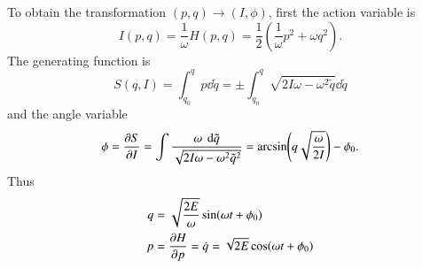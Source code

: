 To obtain the transformation $(p, q) \rightarrow (I, \phi)$, first the action variable is
\begin{equation*}
	I(p, q) = \frac{1}{\omega}H(p, q) = \frac{1}{2} \left( \frac{1}{\omega} p^2 + \omega q^2 \right) .
\end{equation*}
The generating function is
\begin{equation*}
	S(q, I ) = \int_{q_0}^{q} p \dd{\tilde{q}} = \pm \int_{q_0}^{q} \sqrt{2 I \omega - \omega^2 \tilde{q}} \dd{\tilde{q}}
\end{equation*}
and the angle variable
\begin{equation*}
	\phi = \pdv{S}{I} = \int \frac{\omega\ \dd{\tilde{q}}}{\sqrt{2I\omega - \omega^2 \tilde{q}^2}} = \arcsin(q \sqrt{\frac{\omega}{2I}}) - \phi_0.
\end{equation*}
Thus
\begin{align*}
	q &= \sqrt{\frac{2 E}{\omega}} \sin(\omega t + \phi_0) \\
	p &= \pdv{H}{p} = \dot{q} = \sqrt{2E} \cos(\omega t + \phi_0)
\end{align*}
